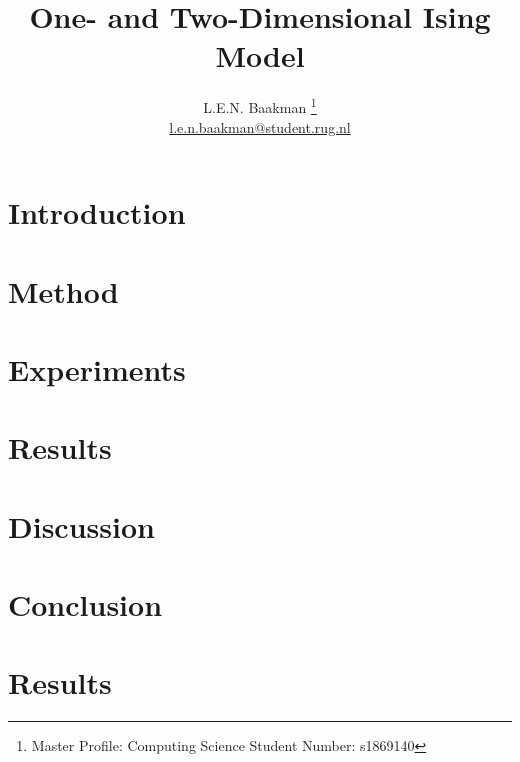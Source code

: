 \documentclass[oneside, a4paper, twocolumn, reqno, fleqn, 11pt, draft]{article}
\title{\sc One- and Two-Dimensional Ising Model}
\author{L.E.N. Baakman%
	\thanks{%
		Master Profile: Computing Science\newline
	 	\hspace*{14pt} Student Number: s1869140%
	}\\%
	\href{mailto:l.e.n.baakman@student.rug.nl}{l.e.n.baakman@student.rug.nl}
}
\begin{document}
\maketitle

\section{Introduction}
\label{s:intro}


\section{Method}
\label{s:method}
	

\section{Experiments}
\label{s:experiment}
	

\section{Results}
\label{s:results}


\section{Discussion}
\label{s:discussion}


\section{Conclusion}
\label{s:conclusion}


\printbibliography

\onecolumn
\allowdisplaybreaks %

\appendix
% 

\section{Results}
\label{a:results1D}


% 
\end{document}
